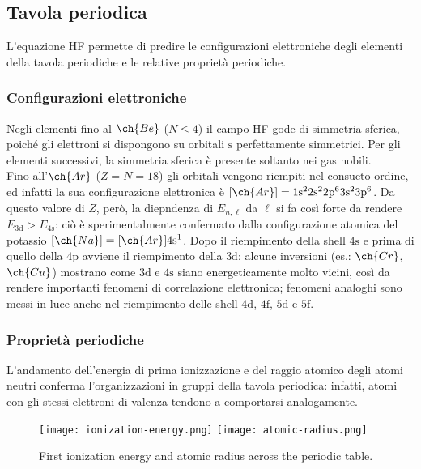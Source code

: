 \subsection{Tavola periodica}

L'equazione HF permette di predire le configurazioni elettroniche degli elementi della tavola periodiche e le relative proprietà periodiche.

\subsubsection{Configurazioni elettroniche}

Negli elementi fino al $ \ch{Be} $ ($ N \le 4 $) il campo HF gode di simmetria sferica, poiché gli elettroni si dispongono su orbitali $ \text{s} $ perfettamente simmetrici. Per gli elementi successivi, la simmetria sferica è presente soltanto nei gas nobili. \\
Fino all'$ \ch{Ar} $ ($ Z = N = 18 $) gli orbitali vengono riempiti nel consueto ordine, ed infatti la sua configurazione elettronica è $ [\ch{Ar}] = \text{1s}^2 \text{2s}^2 \text{2p}^6 \text{3s}^2 \text{3p}^6 $. Da questo valore di $ Z $, però, la diepndenza di $ E_{n,\ell} $ da $ \ell $ si fa così forte da rendere $ E_\text{3d} > E_\text{4s} $: ciò è sperimentalmente confermato dalla configurazione atomica del potassio $ [\ch{Na}] = [\ch{Ar}] \text{4s}^1 $. Dopo il riempimento della shell $ \text{4s} $ e prima di quello della $ \text{4p} $ avviene il riempimento della $ \text{3d} $: alcune inversioni (es.: $ \ch{Cr} $, $ \ch{Cu} $) mostrano come $ \text{3d} $ e $ \text{4s} $ siano energeticamente molto vicini, così da rendere importanti fenomeni di correlazione elettronica; fenomeni analoghi sono messi in luce anche nel riempimento delle shell $ \text{4d} $, $ \text{4f} $, $ \text{5d} $ e $ \text{5f} $.

\subsubsection{Proprietà periodiche}

L'andamento dell'energia di prima ionizzazione e del raggio atomico degli atomi neutri conferma l'organizzazioni in gruppi della tavola periodica: infatti, atomi con gli stessi elettroni di valenza tendono a comportarsi analogamente.

\begin{figure}
	\centering
	\texttt{[image: ionization-energy.png]}
	\texttt{[image: atomic-radius.png]}
	\caption{First ionization energy and atomic radius across the periodic table.}
	\label{ion-en-atom-rad}
\end{figure}

